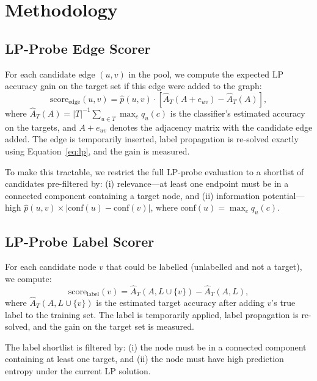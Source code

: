 \documentclass[12pt,a4paper,oneside]{report}
\begin{document}
\chapter{Methodology}
\label{ch:method}

\section{LP-Probe Edge Scorer}

For each candidate edge $(u, v)$ in the pool, we compute the expected LP accuracy gain on the target set if this edge were added to the graph:
\begin{equation}
    \text{score}_{\text{edge}}(u,v) = \hat{p}(u,v) \cdot \left[ \hat{A}_T(A + e_{uv}) - \hat{A}_T(A) \right],
\end{equation}
where $\hat{A}_T(A) = |T|^{-1} \sum_{u \in T} \max_c q_u(c)$ is the classifier's estimated accuracy on the targets, and $A + e_{uv}$ denotes the adjacency matrix with the candidate edge added. The edge is temporarily inserted, label propagation is re-solved exactly using Equation~\eqref{eq:lp}, and the gain is measured.

To make this tractable, we restrict the full LP-probe evaluation to a shortlist of candidates pre-filtered by: (i) relevance---at least one endpoint must be in a connected component containing a target node, and (ii) information potential---high $\hat{p}(u,v) \times |\text{conf}(u) - \text{conf}(v)|$, where $\text{conf}(u) = \max_c q_u(c)$.

\section{LP-Probe Label Scorer}

For each candidate node $v$ that could be labelled (unlabelled and not a target), we compute:
\begin{equation}
    \text{score}_{\text{label}}(v) = \hat{A}_T(A, L \cup \{v\}) - \hat{A}_T(A, L),
\end{equation}
where $\hat{A}_T(A, L \cup \{v\})$ is the estimated target accuracy after adding $v$'s true label to the training set. The label is temporarily applied, label propagation is re-solved, and the gain on the target set is measured.

The label shortlist is filtered by: (i) the node must be in a connected component containing at least one target, and (ii) the node must have high prediction entropy under the current LP solution.
\end{document}
